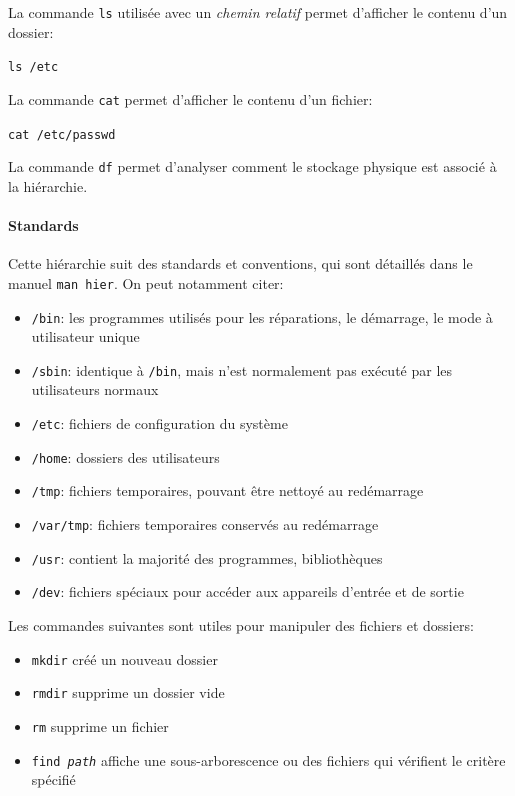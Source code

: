 \documentclass[french, toc]{../cs-classes/cs-classes}
\begin{document}
La commande \texttt{ls} utilisée avec un \emph{chemin relatif} permet d'afficher le contenu d'un dossier:
\begin{center}
    \texttt{ls /etc}
\end{center}

La commande \texttt{cat} permet d'afficher le contenu d'un fichier:
\begin{center}
    \texttt{cat /etc/passwd}
\end{center}

La commande \texttt{df} permet d'analyser comment le stockage physique est associé à la hiérarchie.

\paragraph{Standards} Cette hiérarchie suit des standards et conventions, qui sont détaillés dans le manuel \texttt{man hier}. On peut notamment citer:
\begin{itemize}
    \item \texttt{/bin}: les programmes utilisés pour les réparations, le démarrage, le mode à utilisateur unique
    \item \texttt{/sbin}: identique à \texttt{/bin}, mais n'est normalement pas exécuté par les utilisateurs normaux
    \item \texttt{/etc}: fichiers de configuration du système
    \item \texttt{/home}: dossiers des utilisateurs
    \item \texttt{/tmp}: fichiers temporaires, pouvant être nettoyé au redémarrage
    \item \texttt{/var/tmp}: fichiers temporaires conservés au redémarrage
    \item \texttt{/usr}: contient la majorité des programmes, bibliothèques
    \item \texttt{/dev}: fichiers spéciaux pour accéder aux appareils d'entrée et de sortie 
\end{itemize}

Les commandes suivantes sont utiles pour manipuler des fichiers et dossiers:
\begin{itemize}
    \item \texttt{mkdir} créé un nouveau dossier
    \item \texttt{rmdir} supprime un dossier vide
    \item \texttt{rm} supprime un fichier
    \item \texttt{find \emph{path}} affiche une sous-arborescence ou des fichiers qui vérifient le critère spécifié
\end{itemize}
\end{document}
